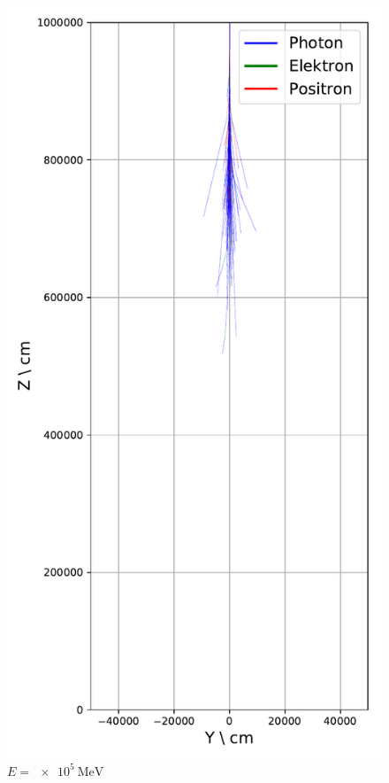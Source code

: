 \documentclass[aspectratio=1610, captions=tableheading, 11pt]{beamer}
\begin{document}
\begin{frame}
   \vspace{-5mm}
  \begin{columns}
    \begin{column}{0.33\textwidth}
      \begin{figure}
          \centering
          \includegraphics[height=0.9\textheight]{shower_presentation/2d_shower_1e5.pdf}
          \caption*{$E = \SI{e5}{\mega\electronvolt}$}
      \end{figure}
    \end{column}



\end{columns}
\end{frame}
\end{document}
